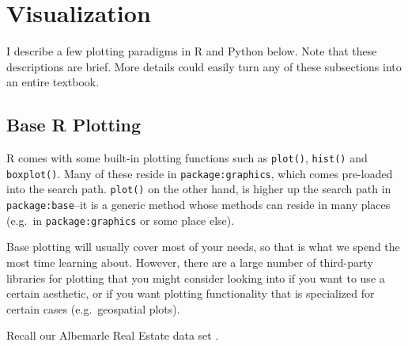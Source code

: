 \documentclass[12pt,krantz2]{krantz}
\makeatletter
\newenvironment{Shaded}{\begin{snugshade}}{\end{snugshade}}
\newcommand{\CommentTok}[1]{\textcolor[rgb]{0.37,0.37,0.37}{\textit{#1}}}
\newcommand{\DataTypeTok}[1]{\textcolor[rgb]{0.27,0.27,0.27}{#1}}
\newcommand{\KeywordTok}[1]{\textcolor[rgb]{0.27,0.27,0.27}{\textbf{#1}}}
\newcommand{\NormalTok}[1]{#1}
\newcommand{\StringTok}[1]{\textcolor[rgb]{0.5,0.5,0.5}{#1}}
\newenvironment{kframe}{%
\medskip{}
\setlength{\fboxsep}{.8em}
 \def\at@end@of@kframe{}%
 \ifinner\ifhmode%
  \def\at@end@of@kframe{\end{minipage}}%
  \begin{minipage}{\columnwidth}%
 \fi\fi%
 \def\FrameCommand##1{\hskip\@totalleftmargin \hskip-\fboxsep
 \colorbox{shadecolor}{##1}\hskip-\fboxsep
     \hskip-\linewidth \hskip-\@totalleftmargin \hskip\columnwidth}%
 \MakeFramed {\advance\hsize-\width
   \@totalleftmargin\z@ \linewidth\hsize
   \@setminipage}}%
 {\par\unskip\endMakeFramed%
 \at@end@of@kframe}
\renewenvironment{Shaded}{\begin{kframe}}{\end{kframe}}
\makeatother
\begin{document}
\hypertarget{visualization}{%
\chapter{Visualization}\label{visualization}}

I describe a few plotting paradigms in R and Python below. Note that these descriptions are brief. More details could easily turn any of these subsections into an entire textbook.

\hypertarget{base-r-plotting}{%
\section{Base R Plotting}\label{base-r-plotting}}

R comes with some built-in plotting functions such as \texttt{plot()}, \texttt{hist()} and \texttt{boxplot()}. Many of these reside in \texttt{package:graphics}, which comes pre-loaded into the search path. \texttt{plot()} on the other hand, is higher up the search path in \texttt{package:base}--it is a generic method whose methods can reside in many places (e.g.~in \texttt{package:graphics} or some place else).

Base plotting will usually cover most of your needs, so that is what we spend the most time learning about. However, there are a large number of third-party libraries for plotting that you might consider looking into if you want to use a certain aesthetic, or if you want plotting functionality that is specialized for certain cases (e.g.~geospatial plots).

Recall our Albemarle Real Estate data set \citep{albemarle_county_gis_web} \citep{clay_ford}.

\begin{Shaded}
\end{Shaded}
\end{document}
